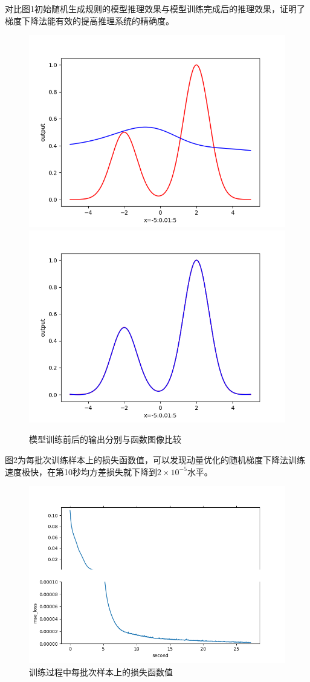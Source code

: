 \documentclass{cjc}
\begin{document}
对比图1初始随机生成规则的模型推理效果与模型训练完成后的推理效果，证明了梯度下降法能有效的提高推理系统的精确度。
\begin{figure}
	\includegraphics[width=0.48\linewidth]{beforetrain.png}
	\includegraphics[width=0.48\linewidth]{aftertrain.png}
	\caption{模型训练前后的输出分别与函数图像比较}
\end{figure}

图2为每批次训练样本上的损失函数值，可以发现动量优化的随机梯度下降法训练速度极快，在第10秒均方差损失就下降到$2\times10^{-5}$水平。
\begin{figure}
	\centering
	\includegraphics[width=\linewidth]{loss.png}
	\caption{训练过程中每批次样本上的损失函数值}
\end{figure}
\end{document}
